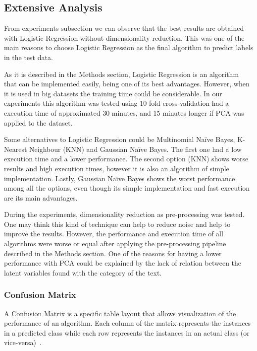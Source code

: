 \documentclass[letterpaper,10pt]{article}
\theoremstyle{mytheor}
\begin{document}
\subsection{Extensive Analysis}

From experiments subsection we can observe that the best results are obtained with Logistic Regression without dimensionality reduction. This was one of the main reasons to choose Logistic Regression as the final algorithm to predict labels in the test data. 

As it is described in the Methods section, Logistic Regression is an algorithm that can be implemented easily, being one of its best advantages. However, when it is used in big datasets the training time could be considerable. In our experiments this algorithm was tested using 10 fold cross-validation had a execution time of approximated 30 minutes, and 15 minutes longer if PCA was applied to the dataset. 

Some alternatives to Logistic Regression could be Multinomial Na\"{i}ve Bayes, K-Nearest Neighbour (KNN) and Gaussian Na\"{i}ve Bayes. The first one had a low execution time and a lower performance. The second option (KNN) shows worse results and high execution times, however it is also an algorithm of simple implementation. Lastly, Gaussian Na\"{i}ve Bayes shows the worst performance among all the options, even though its simple implementation and fast execution are its main advantages.

During the experiments, dimensionality reduction as pre-processing was tested. One may think this kind of technique can help to reduce noise and help to improve the results. However, the performance and execution time of all algorithms were worse or equal after applying the pre-processing pipeline described in the Methods section. One of the reasons for having a lower performance with PCA could be explained by the lack of relation between the latent variables found with the category of the text.   

\subsubsection{Confusion Matrix}

A Confusion Matrix is a specific table layout that allows visualization of the performance of an algorithm. Each column of the matrix represents the instances in a predicted class while each row represents the instances in an actual class (or vice-versa)~\cite{wiki:confusion}.
\end{document}
